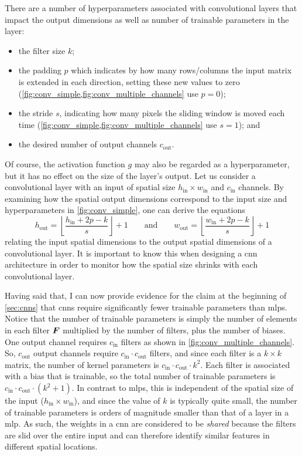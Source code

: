 \documentclass[../report.tex]{subfiles}
\begin{document}
There are a number of hyperparameters associated with convolutional layers that impact the output dimensions as well as number of trainable parameters in the layer:
\begin{itemize}
    \item the filter size $k$;
    \item the padding $p$ which indicates by how many rows/columns the input matrix is extended in each direction, setting these new values to zero (\cref{fig:conv_simple,fig:conv_multiple_channels} use $p=0$);
    \item the stride $s$, indicating how many pixels the sliding window is moved each time (\cref{fig:conv_simple,fig:conv_multiple_channels} use $s=1$); and
    \item the desired number of output channels $c_\text{out}$.
\end{itemize}
Of course, the activation function $g$ may also be regarded as a hyperparameter, but it has no effect on the size of the layer's output.
Let us consider a convolutional layer with an input of spatial size $h_\text{in} \times w_\text{in}$ and $c_\text{in}$ channels.
By examining how the spatial output dimensions correspond to the input size and hyperparameters in \cref{fig:conv_simple}, one can derive the equations
\begin{equation}
    \label{eq:cnn_output_size}
    h_\text{out} = \left\lfloor \frac{h_\text{in} + 2p - k }{s} \right\rfloor + 1 \qquad \text{and} \qquad
    w_\text{out} = \left\lfloor \frac{w_\text{in} + 2p - k }{s} \right\rfloor + 1
\end{equation}
relating the input spatial dimensions to the output spatial dimensions of a convolutional layer.
It is important to know this when designing a \gls{cnn} architecture in order to monitor how the spatial size shrinks with each convolutional layer.

Having said that, I can now provide evidence for the claim at the beginning of \cref{sec:cnns} that \glspl{cnn} require significantly fewer trainable parameters than \glspl{mlp}.
Notice that the number of trainable parameters is simply the number of elements in each filter ${\bm{F}}$ multiplied by the number of filters, plus the number of biases.
One output channel requires $c_\text{in}$ filters as shown in \cref{fig:conv_multiple_channels}.
So, $c_\text{out}$ output channels require $c_\text{in} \cdot c_\text{out}$ filters, and since each filter is a $k \times k$ matrix, the number of kernel parameters is
$c_\text{in} \cdot c_\text{out} \cdot k^2$.
Each filter is associated with a bias that is trainable, so the total number of trainable parameters is 
$c_\text{in} \cdot c_\text{out} \cdot (k^2+1)$.
In contrast to \glspl{mlp}, this is independent of the spatial size of the input ($h_\text{in} \times w_\text{in}$), and since the value of $k$ is typically quite small, the number of trainable parameters is orders of magnitude smaller than that of a layer in a \gls{mlp}.
As such, the weights in a \gls{cnn} are considered to be \emph{shared} because the filters are slid over the entire input and can therefore identify similar features in different spatial locations.
\end{document}
